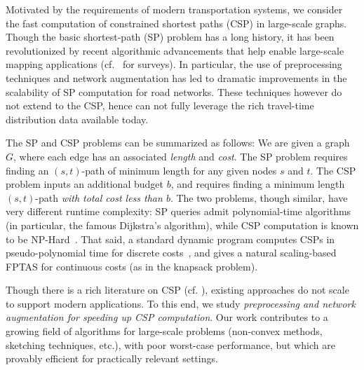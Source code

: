 Motivated by the requirements of modern transportation systems, we consider the fast computation of constrained shortest paths (CSP) in large-scale graphs. Though the basic shortest-path (SP) problem has a long history, it has been revolutionized by recent algorithmic advancements that help enable large-scale mapping applications (cf.~\cite{goldberg_survey,dimacs09} for surveys).
In particular, the use of preprocessing techniques and network augmentation has led to dramatic improvements in the scalability of SP computation for road networks.
These techniques however do not extend to the CSP, hence can not fully leverage the rich travel-time distribution data available today.

The SP and CSP problems can be summarized as follows: We are given a graph $G$, where each edge has an associated \emph{length} and \emph{cost}. 
The SP problem requires finding an $(s,t)$-path of minimum length for any given nodes $s$ and $t$. 
The CSP problem inputs an additional budget $b$, and requires finding a minimum length $(s,t)$-path \emph{with total cost less than $b$}.
The two problems, though similar, have very different runtime complexity: SP queries admit polynomial-time algorithms (in particular, the famous Dijkstra's algorithm), while CSP computation is known to be NP-Hard~\cite{csp_survey}.
That said, a standard dynamic program computes CSPs in pseudo-polynomial time for discrete costs~\cite{alex_bicriteria}, and gives a natural scaling-based FPTAS for continuous costs (as in the knapsack problem).

Though there is a rich literature on CSP (cf. \cite{csp_survey}), existing approaches do not scale to support modern applications. 
To this end, we study \emph{preprocessing and network augmentation for speeding up CSP computation}.
Our work contributes to a growing field of algorithms for large-scale problems (non-convex methods, sketching techniques, etc.), with poor worst-case performance, but which are provably efficient for practically relevant settings.


